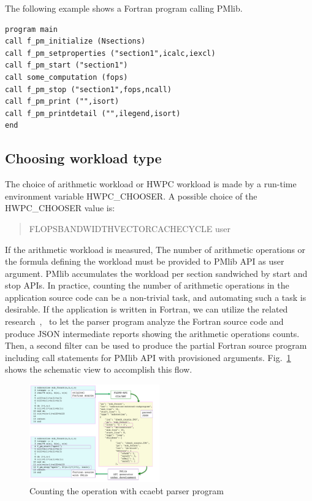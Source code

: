 \documentclass[conference]{IEEEtran}
\begin{document}
The following example shows a Fortran program calling PMlib.

\begin{lstlisting}
program main
call f_pm_initialize (Nsections)
call f_pm_setproperties ("section1",icalc,iexcl)
call f_pm_start ("section1")
call some_computation (fops)
call f_pm_stop ("section1",fops,ncall)
call f_pm_print ("",isort)
call f_pm_printdetail ("",ilegend,isort)
end
\end{lstlisting}

%
\subsection{Choosing workload type}
\label{subsection:Choosing-workload-type}

The choice of arithmetic workload or HWPC workload is made by a
run-time environment variable HWPC\_CHOOSER.
A possible choice of the HWPC\_CHOOSER value is:
\begin{quote}
\begin{small}
FLOPS\textbar BANDWIDTH\textbar VECTOR\textbar CACHE\textbar CYCLE%
\textbar user
\end{small}
\end{quote}

If the arithmetic workload is measured,
The number of arithmetic operations or the formula defining the workload
must be provided to PMlib API as user argument.
PMlib accumulates the workload per section sandwiched by start and stop APIs.
In practice, counting the number of arithmetic operations in the application
source code can be a non-trivial task, and automating such a task is desirable.
%
If the application is written in Fortran,
we can utilize the related research~\cite{Hoshimoto:2015},~\cite{ccaebt:HPCAsia2018}
to let the parser program analyze the Fortran source code
and produce JSON intermediate reports showing the arithmetic operations counts.
Then, a second filter can be used to produce the partial Fortran source program
including call statements for PMlib API with provisioned arguments.
Fig.~\ref{fig:ccaebt4PMlib} shows the schematic view to accomplish this flow.

\begin{figure}[tb]
\centering
\includegraphics[width=0.5\textwidth]{figs/ccaebt4PMlib.pdf}
\caption{Counting the operation with ccaebt parser program}
\label{fig:ccaebt4PMlib}
\end{figure}
\end{document}
